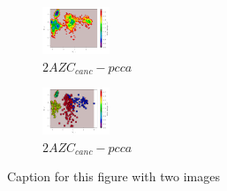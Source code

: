 \documentclass[fleqn,10pt]{wlscirep}
\begin{document}
\begin{figure}[!ht]
\centering
\begin{subfigure}{.5\textwidth}
  \centering
  \includegraphics[width=.9\linewidth]{2AZC_canc/2AZC_canc-tica.pdf}
  \caption{$2AZC_{canc}-pcca$}
  \label{sup:2AZC_canc-tica}
\end{subfigure}%
\begin{subfigure}{.5\textwidth}
  \centering
  \includegraphics[width=.9\linewidth]{2AZC_canc/2AZC_canc-pcca.pdf}
  \caption{$2AZC_{canc}-pcca$}
  \label{sup:2AZC_canc-pcca}
\end{subfigure}
\caption{Caption for this figure with two images}
\label{sup:2AZC_canc-cluster}
\end{figure}
\end{document}
